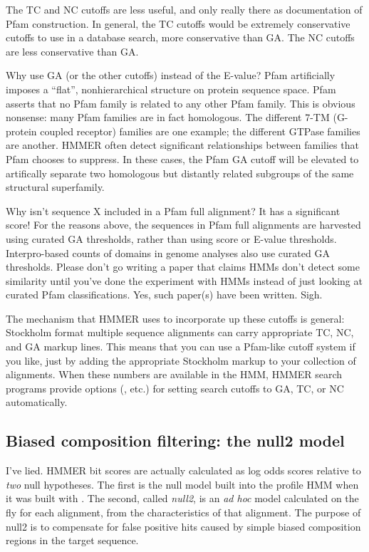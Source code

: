 The TC and NC cutoffs are less useful, and only really there as
documentation of Pfam construction. In general, the TC cutoffs would
be extremely conservative cutoffs to use in a database search, more
conservative than GA. The NC cutoffs are less conservative than GA.

Why use GA (or the other cutoffs) instead of the E-value? Pfam
artificially imposes a ``flat'', nonhierarchical structure on protein
sequence space.  Pfam asserts that no Pfam family is related to any
other Pfam family. This is obvious nonsense: many Pfam families are in
fact homologous.  The different 7-TM (G-protein coupled receptor)
families are one example; the different GTPase families are
another. HMMER often detect significant relationships between families
that Pfam chooses to suppress. In these cases, the Pfam GA cutoff will
be elevated to artifically separate two homologous but distantly
related subgroups of the same structural superfamily. 

\begin{srefaq}{Why isn't sequence X included in a Pfam full alignment?
It has a significant score!} For the reasons above, the sequences in
Pfam full alignments are harvested using curated GA
thresholds, rather than using score or E-value
thresholds. Interpro-based counts of domains in genome analyses also
use curated GA thresholds.  Please don't go writing a
paper that claims HMMs don't detect some similarity until you've done
the experiment with HMMs instead of just looking at curated Pfam
classifications. Yes, such paper(s) have been written. Sigh.
\end{srefaq}

The mechanism that HMMER uses to incorporate up these cutoffs is
general: Stockholm format multiple sequence alignments can carry
appropriate TC, NC, and GA markup lines. This means that you can use a
Pfam-like cutoff system if you like, just by adding the appropriate
Stockholm markup to your collection of alignments. When these numbers
are available in the HMM, HMMER search programs provide options
(, etc.) for setting search cutoffs to GA, TC, or NC
automatically.

\subsection{Biased composition filtering: the null2 model}

I've lied. HMMER bit scores are actually calculated as log odds scores
relative to \emph{two} null hypotheses. The first is the null model
built into the profile HMM when it was built with .
The second, called \emph{null2}, is an \emph{ad hoc} model calculated
on the fly for each alignment, from the characteristics of that
alignment. The purpose of null2 is to compensate for false positive
hits caused by simple biased composition regions in the target
sequence.


